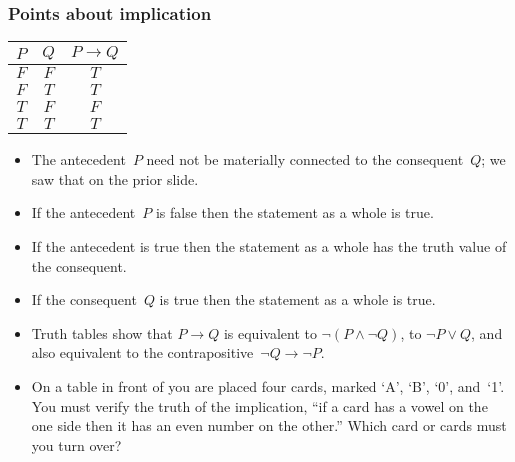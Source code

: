 \documentclass[10pt,t]{beamer}
\begin{document}
\begin{frame}
\frametitle{Points about implication}
\begin{center}
  \begin{tabular}{cc|c}
    $P$  &$Q$  &$P \rightarrow Q$  \\ \hline
    $F$  &$F$  &$T$          \\
    $F$  &$T$  &$T$          \\
    $T$  &$F$  &$F$          \\
    $T$  &$T$  &$T$     
  \end{tabular}
\end{center}
\begin{itemize}
\item The antecedent~$P$ need not be materially connected to the 
  consequent~$Q$; 
  we saw that on the prior slide.
\pause
\item If the antecedent~$P$ is false then the statement as a whole is true.
\pause
\item If the antecedent is true then the statement as a whole has the
  truth value of the consequent.
\pause
\item If the consequent~$Q$ is true then the statement as a whole is true. 
\pause
\item Truth tables show that $P\rightarrow Q$
  is equivalent to $\neg(P\wedge \neg Q)$, 
  to $\neg P\vee Q$,
  and also equivalent to the \alert{contrapositive}~$\neg Q\rightarrow \neg P$.
\pause
\item 
  On a table in front of you are placed four cards, 
  marked `A', `B', `0', and~`1'.
  You must verify the truth of the implication, 
  ``if a card has a vowel on the one side 
  then it has an even number on the other.''  
  Which card or cards must you turn over?
\end{itemize}


\end{frame}
\end{document}
